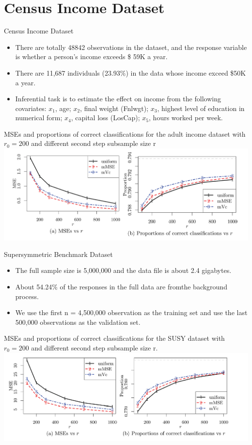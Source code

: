 \documentclass[12pt]{beamer}
\begin{document}
\section{Census Income Dataset}
\begin{frame}{Census Income Dataset}
\begin{itemize}
\item There are totally 48842 observations in the dataset, and the response variable is whether a person's income exceeds \$ 59K a year.
\item There are 11,687 individuals
(23.93\%) in the data whose income exceed \$50K a year.
\item Inferential task is to estimate the effect on income from the following covariates: $x_1$, age; $x_2$, final weight (Fnlwgt); $x_3$, highest
level of education in numerical form; $x_4$, capital loss (LosCap);
$x_5$, hours worked per week. 
\end{itemize}
\end{frame}
\begin{frame}{MSEs and proportions of correct classifications for the adult income dataset with $r_0=200$ and different second step subsample size r}
\includegraphics[scale=0.8]{fig15.png} 
\end{frame}

\begin{frame}{Supersymmetric Benchmark Dataset}
\begin{itemize}
\item The full sample size is 5,000,000 and the
data file is about 2.4 gigabytes. 
\item About 54.24\% of the responses in
the full data are fromthe background process. 
\item  We use the first
n = 4,500,000 observation as the training set and use the last
500,000 observations as the validation set.
\end{itemize}
\end{frame}

\begin{frame}{MSEs and proportions of correct classifications for the SUSY dataset with $r_0=200$ and different second step subsample size r.}
\includegraphics[scale=0.8]{fig16.png} 
\end{frame}
\end{document}
